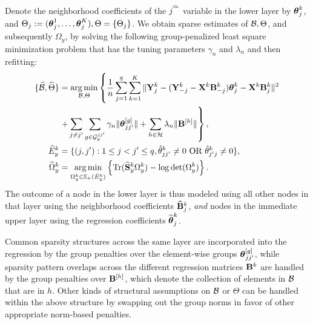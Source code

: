 Denote the neighborhood coefficients of the $j^{\operatorname*{^{\text{th}}}}$ variable in the lower layer by ${\boldsymbol{\theta}}_j^k$, and $\Theta_j := ({\boldsymbol{\theta}}_j^1, \ldots, {\boldsymbol{\theta}}_j^K), \Theta = \{ \Theta_j \}$. We obtain sparse estimates of ${\cal{B}}, \Theta$, and subsequently $\Omega_y$, by solving the following group-penalized least square minimization problem that has the tuning parameters $\gamma_n$ and $\lambda_n$ and then refitting:
%
\begin{align}
\{ \widehat {{\cal{B}}}, \widehat \Theta \} &= 
\operatorname*{arg\,min}_{{\cal{B}}, \Theta} \left\{ \frac{1}{n} \sum_{j=1}^q \sum_{k=1}^K \| {\mathbf{Y}}^k_j - ({\mathbf{Y}}_{-j}^k - {\mathbf{X}}^k {\mathbf{B}}_{-j}^k) {\boldsymbol{\theta}}_j^k - {\mathbf{X}}^k {\mathbf{B}}_j^k \|^2 \right. \notag\\
& \left. + \sum_{j \neq j'} \sum_{g \in {\cal{G}}_y^{jj'}} \gamma_n \| {\boldsymbol{\theta}}_{jj'}^{[g]} \| + \sum_{h \in {\cal{H}}} \lambda_n \| {\mathbf{B}}^{[h]} \| \right\}, \label{eqn:jmmle-objfun}\\
\widehat E_y^k &= \{(j,j'): 1 \leq j < j' \leq q, \hat \theta_{jj'}^k \neq 0 \text{ OR } \hat \theta_{j'j}^k \neq 0 \}, \notag\\
\widehat \Omega_y^k &= \operatorname*{arg\,min}_{\Omega_y^k \in {\mathbb{S}}_+ (\hat E_y^k)}
\left\{ \operatorname*{Tr} (\widehat {{\mathbf{S}}}_y^k \Omega_y^k ) - \log \det (\Omega_y^k) \right\}. \label{eqn:omega-y-calc}
\end{align}
%
The outcome of a node in the lower layer is thus modeled using all other nodes in that layer using the neighborhood coefficients $\widehat {{\mathbf{B}}}_j^k$, {\it and} nodes in the immediate upper layer using the regression coefficients $\widehat {{\boldsymbol{\theta}}}_j^k$.

\begin{Remark}
Common sparsity structures across the same layer are incorporated into the regression by the group penalties over the element-wise groups ${\boldsymbol{\theta}}_{jj'}^{[g]}$, while sparsity pattern overlaps across the different regression matrices ${\mathbf{B}}^k$ are handled by the group penalties over ${\mathbf{B}}^{[h]}$, which denote the collection of elements in ${\cal{B}}$ that are in $h$. Other kinds of structural assumptions on ${\cal{B}}$ or $\Theta$ can be handled within the above structure by swapping out the group norms in favor of other appropriate norm-based penalties.
\end{Remark}

